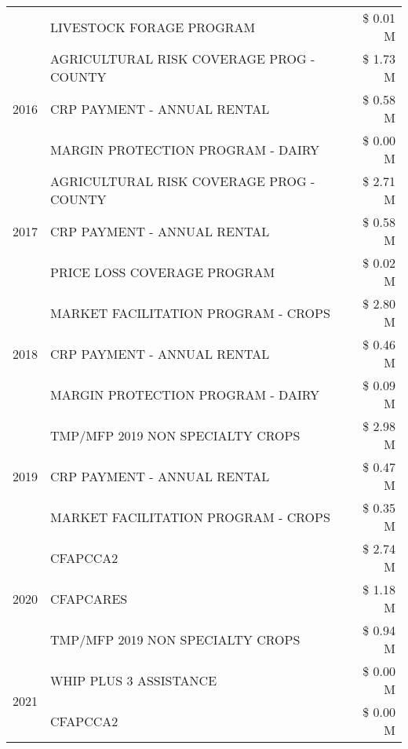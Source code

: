 \begin{tabular}{llr}
 & LIVESTOCK FORAGE PROGRAM & \$ 0.01 M \\
\cline{1-3}
\multirow[t]{3}{*}{2016} & AGRICULTURAL RISK COVERAGE PROG - COUNTY      & \$ 1.73 M \\
 & CRP PAYMENT - ANNUAL RENTAL                   & \$ 0.58 M \\
 & MARGIN PROTECTION PROGRAM - DAIRY             & \$ 0.00 M \\
\cline{1-3}
\multirow[t]{3}{*}{2017} & AGRICULTURAL RISK COVERAGE PROG - COUNTY & \$ 2.71 M \\
 & CRP PAYMENT - ANNUAL RENTAL & \$ 0.58 M \\
 & PRICE LOSS COVERAGE PROGRAM & \$ 0.02 M \\
\cline{1-3}
\multirow[t]{3}{*}{2018} & MARKET FACILITATION PROGRAM - CROPS & \$ 2.80 M \\
 & CRP PAYMENT - ANNUAL RENTAL & \$ 0.46 M \\
 & MARGIN PROTECTION PROGRAM - DAIRY & \$ 0.09 M \\
\cline{1-3}
\multirow[t]{3}{*}{2019} & TMP/MFP 2019 NON SPECIALTY CROPS & \$ 2.98 M \\
 & CRP PAYMENT - ANNUAL RENTAL & \$ 0.47 M \\
 & MARKET FACILITATION PROGRAM - CROPS & \$ 0.35 M \\
\cline{1-3}
\multirow[t]{3}{*}{2020} & CFAPCCA2 & \$ 2.74 M \\
 & CFAPCARES & \$ 1.18 M \\
 & TMP/MFP 2019 NON SPECIALTY CROPS & \$ 0.94 M \\
\cline{1-3}
\multirow[t]{2}{*}{2021} & WHIP PLUS 3 ASSISTANCE & \$ 0.00 M \\
 & CFAPCCA2 & \$ 0.00 M \\
\cline{1-3}
\bottomrule
\end{tabular}
